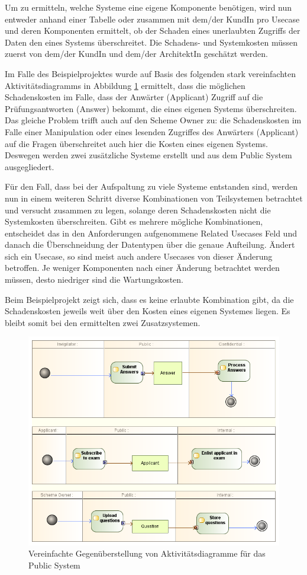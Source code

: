 Um zu ermitteln, welche Systeme eine eigene Komponente benötigen, wird nun entweder anhand einer Tabelle oder zusammen mit dem/der KundIn pro Usecase und deren Komponenten ermittelt, ob der Schaden eines unerlaubten Zugriffs der Daten den eines Systems überschreitet. Die Schadens- und Systemkosten müssen zuerst von dem/der KundIn und dem/der ArchitektIn geschätzt werden.

Im Falle des Beispielprojektes wurde auf Basis des folgenden stark vereinfachten Aktivitätsdiagramms in Abbildung \ref{fig:actorarch} ermittelt, dass die möglichen Schadenskosten im Falle, dass der Anwärter (Applicant) Zugriff auf die Prüfungsantworten (Answer) bekommt, die eines eigenen Systems überschreiten. Das gleiche Problem trifft auch auf den Scheme Owner zu: die Schadenskosten im Falle einer Manipulation oder eines lesenden Zugriffes des Anwärters (Applicant) auf die Fragen überschreitet auch hier die Kosten eines eigenen Systems. Deswegen werden zwei zusätzliche Systeme erstellt und aus dem Public System ausgegliedert.

Für den Fall, dass bei der Aufspaltung zu viele Systeme entstanden sind, werden nun in einem weiteren Schritt diverse Kombinationen von Teilsystemen betrachtet und versucht zusammen zu legen, solange deren Schadenskosten nicht die Systemkosten überschreiten. Gibt es mehrere mögliche Kombinationen, entscheidet das in den Anforderungen aufgenommene Related Usecases Feld und danach die Überschneidung der Datentypen über die genaue Aufteilung. Ändert sich ein Usecase, so sind meist auch andere Usecases von dieser Änderung betroffen. Je weniger Komponenten nach einer Änderung betrachtet werden müssen, desto niedriger sind die Wartungskosten.

Beim Beispielprojekt zeigt sich, dass es keine erlaubte Kombination gibt, da die Schadenskosten jeweils weit über den Kosten eines eigenen Systemes liegen. Es bleibt somit bei den ermittelten zwei Zusatzsystemen.

\begin{figure}[H]
    \centering
    \includegraphics[scale=0.6]{uml/actorarch.png}
    \caption{Vereinfachte Gegenüberstellung von Aktivitätsdiagramme für das Public System}
    \label{fig:actorarch}
\end{figure}

